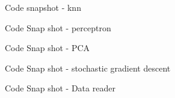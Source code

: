 \documentclass[11pt]{article}
\begin{document}
    
    
 \begin{tcolorbox}
    Code snapshot - knn

    
    \begin{center}
    
    \end{center}
    
    
    
    \end{tcolorbox}
    
    \begin{tcolorbox}
    Code Snap shot - perceptron
    
    \begin{center}
    
    \end{center}
    
    
    
    \end{tcolorbox}
    
     \begin{tcolorbox}
    Code Snap shot - PCA
    
    \begin{center}
    
    \end{center}
    
    
    
    \end{tcolorbox}
    
    
     \begin{tcolorbox}
    Code Snap shot - stochastic gradient descent
    
    \begin{center}
    
    \end{center}
    
    
    
    \end{tcolorbox}
    
     \begin{tcolorbox}
    Code Snap shot - Data reader
    
    \begin{center}
    
    \end{center}
    
    
    
    \end{tcolorbox}
    
    
    
\end{document}
